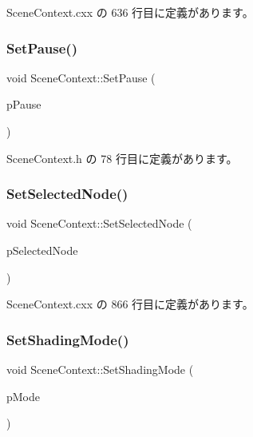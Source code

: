  Scene\+Context.\+cxx の 636 行目に定義があります。

\mbox{\label{class_scene_context_a0bb98ae02d7fd834f7cf83f79fb7e628}} 
\subsubsection{\texorpdfstring{Set\+Pause()}{SetPause()}}
{\footnotesize\ttfamily void Scene\+Context\+::\+Set\+Pause (\begin{DoxyParamCaption}\item[{bool}]{p\+Pause }\end{DoxyParamCaption})\hspace{0.3cm}{\ttfamily [inline]}}



 Scene\+Context.\+h の 78 行目に定義があります。

\mbox{\label{class_scene_context_a181d85ec09f86f556fa2d4050fa28fb8}} 
\subsubsection{\texorpdfstring{Set\+Selected\+Node()}{SetSelectedNode()}}
{\footnotesize\ttfamily void Scene\+Context\+::\+Set\+Selected\+Node (\begin{DoxyParamCaption}\item[{\hyperlink{class_fbx_node}{Fbx\+Node} $\ast$}]{p\+Selected\+Node }\end{DoxyParamCaption})}



 Scene\+Context.\+cxx の 866 行目に定義があります。

\mbox{\label{class_scene_context_ac2719e4c499f1d811619ea21ea477392}} 
\subsubsection{\texorpdfstring{Set\+Shading\+Mode()}{SetShadingMode()}}
{\footnotesize\ttfamily void Scene\+Context\+::\+Set\+Shading\+Mode (\begin{DoxyParamCaption}\item[{\hyperlink{_gl_functions_8h_a474716bb9224d44d614704a0bd331d99}{Shading\+Mode}}]{p\+Mode }\end{DoxyParamCaption})}



